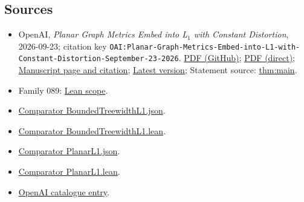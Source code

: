\documentclass[11pt]{article}
\begin{document}
\subsection{Sources}
\begin{itemize}
\item OpenAI, \emph{Planar Graph Metrics Embed into L\({}_{1}\) with Constant Distortion}, 2026-09-23; citation key \texttt{OAI:Planar-Graph-Metrics-Embed-into-L1-with-Constant-Distortion-September-23-2026}. \href{https://github.com/openai/math/blob/adc7f1241b42e322a6451854ab7e4b4c146bf78a/preprints/Planar-Graph-Metrics-Embed-into-L1-with-Constant-Distortion-September-23-2026/paper.pdf}{PDF (GitHub)}; \href{https://github.com/openai/math/raw/adc7f1241b42e322a6451854ab7e4b4c146bf78a/preprints/Planar-Graph-Metrics-Embed-into-L1-with-Constant-Distortion-September-23-2026/paper.pdf}{PDF (direct)}; \href{https://github.com/openai/math/blob/adc7f1241b42e322a6451854ab7e4b4c146bf78a/preprints/Planar-Graph-Metrics-Embed-into-L1-with-Constant-Distortion-September-23-2026/README.md}{Manuscript page and citation}; \href{https://github.com/openai/math/blob/main/preprints/Planar-Graph-Metrics-Embed-into-L1-with-Constant-Distortion-September-23-2026/paper.pdf}{Latest version}; Statement source: \href{https://github.com/openai/math/blob/adc7f1241b42e322a6451854ab7e4b4c146bf78a/preprints/Planar-Graph-Metrics-Embed-into-L1-with-Constant-Distortion-September-23-2026/build/sections/introduction.tex\#L13}{thm:main}.
\item Family 089: \href{https://github.com/openai/math/blob/adc7f1241b42e322a6451854ab7e4b4c146bf78a/lean/docs/089.md}{Lean scope}.
\item \href{https://github.com/openai/math/blob/adc7f1241b42e322a6451854ab7e4b4c146bf78a/lean/ComparatorChallenges/BoundedTreewidthL1.json}{Comparator BoundedTreewidthL1.json}.
\item \href{https://github.com/openai/math/blob/adc7f1241b42e322a6451854ab7e4b4c146bf78a/lean/ComparatorChallenges/BoundedTreewidthL1.lean}{Comparator BoundedTreewidthL1.lean}.
\item \href{https://github.com/openai/math/blob/adc7f1241b42e322a6451854ab7e4b4c146bf78a/lean/ComparatorChallenges/PlanarL1.json}{Comparator PlanarL1.json}.
\item \href{https://github.com/openai/math/blob/adc7f1241b42e322a6451854ab7e4b4c146bf78a/lean/ComparatorChallenges/PlanarL1.lean}{Comparator PlanarL1.lean}.
\item \href{https://github.com/openai/math/blob/adc7f1241b42e322a6451854ab7e4b4c146bf78a/CONTENTS.md}{OpenAI catalogue entry}.
\end{itemize}
\end{document}
